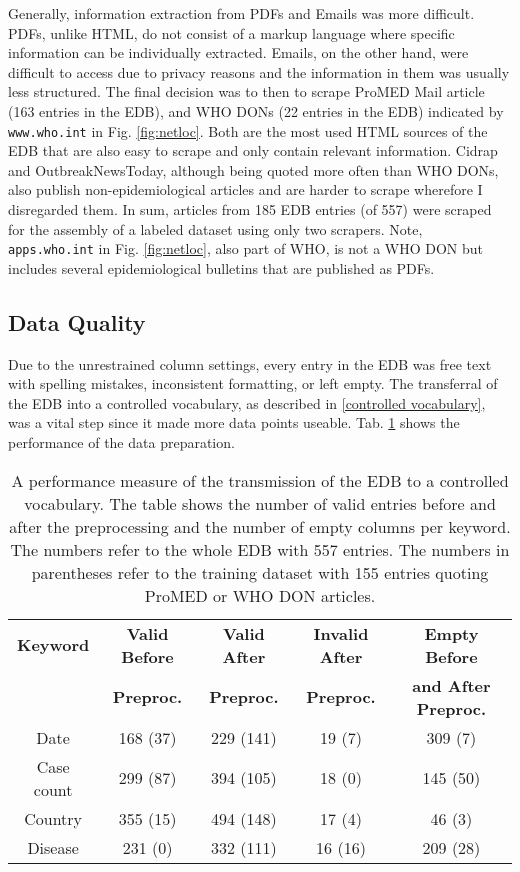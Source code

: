   Generally, information extraction from PDFs and Emails was more difficult.
  PDFs, unlike HTML, do not consist of a markup language where specific information can be individually extracted.
  Emails, on the other hand, were difficult to access due to privacy reasons and the information in them was usually less structured.
  The final decision was to then to scrape ProMED Mail article (163 entries in the EDB), and WHO DONs (22 entries in the EDB) indicated by \texttt{www.who.int} in Fig. \ref{fig:netloc}.
  Both are the most used HTML sources of the EDB that are also easy to scrape and only contain relevant information.
  Cidrap and OutbreakNewsToday, although being quoted more often than WHO DONs, also publish non-epidemiological articles and are harder to scrape wherefore I disregarded them.
  In sum, articles from 185 EDB entries (of 557) were scraped for the assembly of a labeled dataset using only two scrapers.
  Note, \texttt{apps.who.int} in Fig. \ref{fig:netloc}, also part of WHO, is not a WHO DON but includes several epidemiological bulletins that are published as PDFs.

\subsection{Data Quality}
  Due to the unrestrained column settings, every entry in the EDB was free text with spelling mistakes, inconsistent formatting, or left empty.
  The transferral of the EDB into a controlled vocabulary, as described in \ref{controlled vocabulary}, was a vital step since it made more data points useable.
  Tab. \ref{table:preprocessing performance} shows the performance of the data preparation.
  \begin{table}[h!]
    \centering
    \caption{A performance measure of the transmission of the EDB to a controlled vocabulary. The table shows the number of valid entries before and after the preprocessing and the number of empty columns per keyword. The numbers refer to the whole EDB with 557 entries. The numbers in parentheses refer to the training dataset with 155 entries quoting ProMED or WHO DON articles.}
    \begin{tabular}{@{}ccccc@{}}
      \toprule
      \textbf{Keyword} & \textbf{Valid Before} & \textbf{Valid After} & \textbf{Invalid After} & \textbf{Empty Before} \\
      & \textbf{Preproc.} & \textbf{Preproc.} & \textbf{Preproc.}  &\textbf{and After Preproc.} \\
      \midrule
      Date& 168 (37)& 229 (141)&  19 (7)& 309 (7) \\
      Case count& 299 (87)& 394 (105)& 18 (0)& 145 (50) \\
      Country& 355 (15) & 494 (148) &  17 (4)& 46 (3) \\
      Disease& 231 (0) & 332 (111)& 16 (16)& 209 (28) \\
      \bottomrule
    \end{tabular}
  \label{table:preprocessing performance}
  \end{table}

